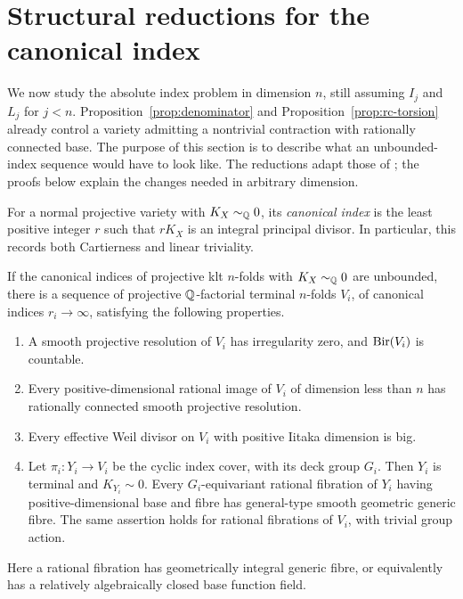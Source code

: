 \section{Structural reductions for the canonical index}
\label{sec:reductions}

We now study the absolute index problem in dimension $n$, still assuming
$I_j$ and $L_j$ for $j<n$.  Proposition~\ref{prop:denominator} and
Proposition~\ref{prop:rc-torsion} already control a variety admitting a
nontrivial contraction with rationally connected base.  The purpose of
this section is to describe what an unbounded-index sequence would have
to look like.  The reductions adapt those of
\cite[Section \emph{Structural reductions for the canonical index}]{U4};
the proofs below explain the changes needed in arbitrary dimension.

For a normal projective variety with $K_X\sim_{\mathbb Q}0$, its
\emph{canonical index} is the least positive integer $r$ such that
$rK_X$ is an integral principal divisor.  In particular, this records
both Cartierness and linear triviality.

\begin{proposition}
\label{prop:index-reduction}
If the canonical indices of projective klt $n$-folds with
$K_X\sim_{\mathbb Q}0$ are unbounded, there is a sequence of projective
$\mathbb Q$-factorial terminal $n$-folds $V_i$, of canonical indices
$r_i\to\infty$, satisfying the following properties.
\begin{enumerate}
\item A smooth projective resolution of $V_i$ has irregularity zero,
and $\operatorname{Bir}(V_i)$ is countable.
\item Every positive-dimensional rational image of $V_i$ of dimension
less than $n$ has rationally connected smooth projective resolution.
\item Every effective Weil divisor on $V_i$ with positive Iitaka
dimension is big.
\item Let $\pi_i:Y_i\to V_i$ be the cyclic index cover, with its deck
group $G_i$.  Then $Y_i$ is terminal and $K_{Y_i}\sim0$.  Every
$G_i$-equivariant rational fibration of $Y_i$ having positive-dimensional
base and fibre has general-type smooth geometric generic fibre.
The same assertion holds for rational fibrations of $V_i$, with trivial
group action.
\end{enumerate}
Here a rational fibration has geometrically integral generic fibre, or
equivalently has a relatively algebraically closed base function field.
\end{proposition}

